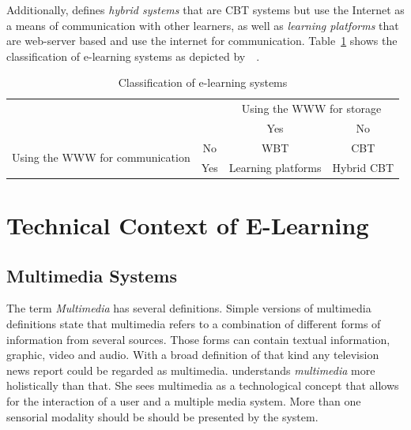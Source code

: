 Additionally,  \citeyear{Richert2007} defines
\emph{hybrid systems} that are CBT systems but use the Internet as a means of
communication with other learners,
as well as \emph{learning platforms} that are web-server based and use the
internet for communication.
Table~\ref{table:elearningsystems} shows the classification of e-learning systems
as depicted by~~\citeyear{Richert2007}.
\begin{table}[htbp]
\begin{center}
\begin{tabular}{|c|c|c|c|}
  \hline
  \multicolumn{2}{|c|}{} & \multicolumn{2}{|c|}{Using the WWW for storage} \\
  \cline{3-4}
  \multicolumn{2}{|c|}{} & Yes & No \\
  \hline
  \multirow{2}{*}{Using the WWW for communication} & No & WBT & CBT \\
  \cline{2-4}
   & Yes & Learning platforms & Hybrid CBT \\
  \hline
\end{tabular}
\end{center}
\caption{Classification of e-learning systems}
\label{table:elearningsystems}
\end{table}

\section{Technical Context of E-Learning}
\label{sec:elearn:technicalcontext}

\subsection{Multimedia Systems}
\label{sec:elearn:multimediasystems}

The term \emph{Multimedia} has several definitions. Simple versions of 
multimedia definitions state that multimedia refers to a combination of
different forms of information from several sources. Those forms can contain
textual information, graphic, video and audio. With a broad definition
of that kind any television news report could be regarded as multimedia.
 \citeyear{Richert2007} understands \emph{multimedia}
more holistically than that. She sees multimedia as a technological concept 
that allows for the interaction of a user and a multiple media system.
More than one sensorial modality should be should be presented by the system.

